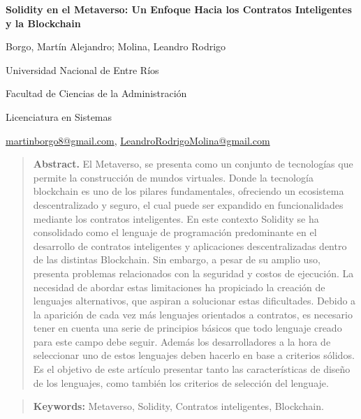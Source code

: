 \documentclass[a4paper,10pt]{article}
\begin{document}
	\centering
	{\fontsize{14}{17}\bfseries Solidity en el Metaverso: Un Enfoque Hacia los Contratos Inteligentes y la Blockchain\par}
	{\small Borgo, Martín Alejandro; Molina, Leandro Rodrigo\par}
	{\normalsize Universidad Nacional de Entre Ríos\par}
	{\normalsize Facultad de Ciencias de la Administración\par}
	{\normalsize Licenciatura en Sistemas \par}
	{\small \href{mailto:martinborgo8@gmail.com}{martinborgo8@gmail.com}, \href{mailto:LeandroRodrigoMolina@gmail.com}{LeandroRodrigoMolina@gmail.com}\par}	
	{\small \justify \begin{quote}\textbf{Abstract.} El Metaverso, se presenta como un conjunto de tecnologías que permite la construcción de mundos virtuales. Donde la tecnología blockchain es uno de los pilares fundamentales, ofreciendo un ecosistema descentralizado y seguro, el cual puede ser expandido en funcionalidades mediante los contratos inteligentes. En este contexto Solidity se ha consolidado como el lenguaje de programación predominante en el desarrollo de contratos inteligentes y aplicaciones descentralizadas dentro de las distintas Blockchain. Sin embargo, a pesar de su amplio uso, presenta problemas relacionados con la seguridad y costos de ejecución. La necesidad de abordar estas limitaciones ha propiciado la creación de lenguajes alternativos, que aspiran a solucionar estas dificultades. Debido a la aparición de cada vez más lenguajes orientados a contratos, es necesario tener en cuenta una serie de principios básicos que todo lenguaje creado para este campo debe seguir. Además los desarrolladores a la hora de seleccionar uno de estos lenguajes deben hacerlo en base a criterios sólidos. Es el objetivo de este artículo presentar tanto las características de diseño de los lenguajes, como también los criterios de selección del lenguaje. \end{quote} \par}
	{\small \justify \begin{quote} \textbf{Keywords:} Metaverso, Solidity, Contratos inteligentes, Blockchain. \end{quote} \par}
	\justifying %
\end{document}
